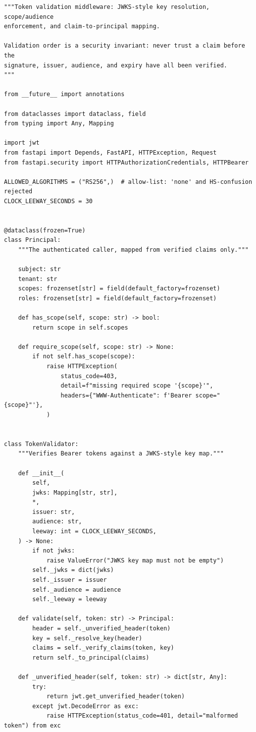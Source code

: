 \begin{verbatim}
"""Token validation middleware: JWKS-style key resolution, scope/audience
enforcement, and claim-to-principal mapping.

Validation order is a security invariant: never trust a claim before the
signature, issuer, audience, and expiry have all been verified.
"""

from __future__ import annotations

from dataclasses import dataclass, field
from typing import Any, Mapping

import jwt
from fastapi import Depends, FastAPI, HTTPException, Request
from fastapi.security import HTTPAuthorizationCredentials, HTTPBearer

ALLOWED_ALGORITHMS = ("RS256",)  # allow-list: 'none' and HS-confusion rejected
CLOCK_LEEWAY_SECONDS = 30


@dataclass(frozen=True)
class Principal:
    """The authenticated caller, mapped from verified claims only."""

    subject: str
    tenant: str
    scopes: frozenset[str] = field(default_factory=frozenset)
    roles: frozenset[str] = field(default_factory=frozenset)

    def has_scope(self, scope: str) -> bool:
        return scope in self.scopes

    def require_scope(self, scope: str) -> None:
        if not self.has_scope(scope):
            raise HTTPException(
                status_code=403,
                detail=f"missing required scope '{scope}'",
                headers={"WWW-Authenticate": f'Bearer scope="{scope}"'},
            )


class TokenValidator:
    """Verifies Bearer tokens against a JWKS-style key map."""

    def __init__(
        self,
        jwks: Mapping[str, str],
        *,
        issuer: str,
        audience: str,
        leeway: int = CLOCK_LEEWAY_SECONDS,
    ) -> None:
        if not jwks:
            raise ValueError("JWKS key map must not be empty")
        self._jwks = dict(jwks)
        self._issuer = issuer
        self._audience = audience
        self._leeway = leeway

    def validate(self, token: str) -> Principal:
        header = self._unverified_header(token)
        key = self._resolve_key(header)
        claims = self._verify_claims(token, key)
        return self._to_principal(claims)

    def _unverified_header(self, token: str) -> dict[str, Any]:
        try:
            return jwt.get_unverified_header(token)
        except jwt.DecodeError as exc:
            raise HTTPException(status_code=401, detail="malformed token") from exc


\end{verbatim}
